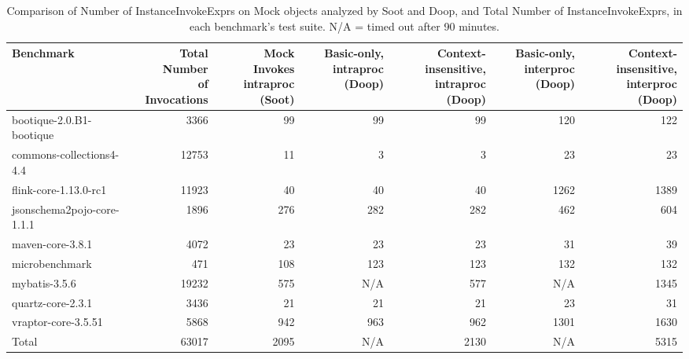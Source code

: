 \begin{table*}
	\centering
	\caption{Comparison of Number of InstanceInvokeExprs on Mock objects analyzed by Soot and Doop, and Total Number of InstanceInvokeExprs, in each benchmark's test suite. N/A = timed out after 90 minutes.}
	\begin{tabular}{lrrrrrr}
		\toprule
		Benchmark & \thead{Total Number \\ of Invocations} & \thead{Mock Invokes \\ intraproc (Soot)} & \thead{Basic-only, \\ intraproc (Doop)} & \thead{Context-insensitive, \\ intraproc (Doop)} &  \thead{Basic-only, \\ interproc (Doop)} &\thead{Context-insensitive, \\ interproc (Doop)} \\
		\midrule
		bootique-2.0.B1-bootique           		&  3366     &  99   & 99    & 99   & 120   & 122    \\
		commons-collections4-4.4       			&  12753    &  11   & 3     &  3   & 23    & 23   \\
		flink-core-1.13.0-rc1           		&  11923    &  40   & 40    & 40   & 1262  & 1389   \\
		jsonschema2pojo-core-1.1.1      	     	&  1896     &  276  & 282   & 282  & 462   & 604   \\
		maven-core-3.8.1           			&  4072     &  23   & 23    & 23   & 31    & 39  \\
		microbenchmark         		  		&  471      &  108  & 123   & 123  & 132   & 132   \\
		mybatis-3.5.6         		  		&  19232    &  575  & N/A   & 577  &  N/A  & 1345     \\
		quartz-core-2.3.1       	  		&  3436     &  21   & 21    & 21   & 23    & 31    \\
		vraptor-core-3.5.51        	  		&  5868     &  942  & 963   & 962  & 1301  & 1630   \\
		\bottomrule
		Total        	  				&  63017    & 2095  & N/A   & 2130  & N/A  & 5315   \\
	\end{tabular}
	\label{tab:invokes}
\end{table*}

